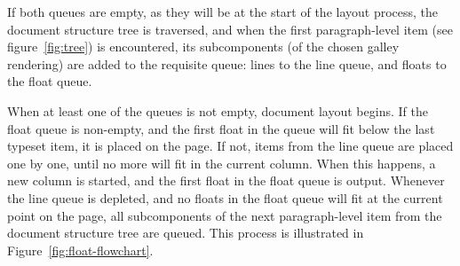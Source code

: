 If both queues are empty, as they will be at the start of the layout process, the document structure tree is traversed, and when the first paragraph-level item (see figure~\ref{fig:tree}) is encountered, its subcomponents (of the chosen galley rendering) are added to the requisite queue: lines to the line queue, and floats to the float queue.

When at least one of the queues is not empty, document layout begins. If the float queue is non-empty, and the first float in the queue will fit below the last typeset item, it is placed on the page. If not, items from the line queue are placed one by one, until no more will fit in the current column. When this happens, a new column is started, and the first float in the float queue is output. Whenever the line queue is depleted, and no floats in the float queue will fit at the current point on the page, all subcomponents of the next paragraph-level item from the document structure tree are queued. This process is illustrated in Figure~\ref{fig:float-flowchart}.

